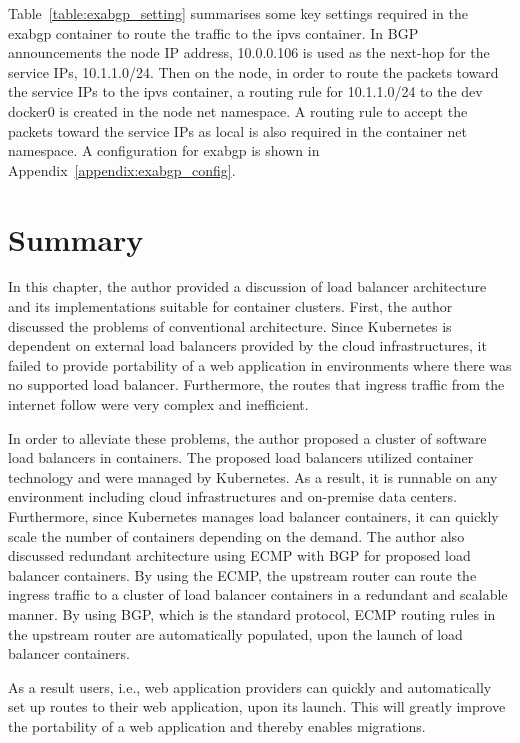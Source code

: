Table~\ref{table:exabgp_setting} summarises some key settings required in the exabgp container to route the traffic to the ipvs container.
In BGP announcements the node IP address, 10.0.0.106 is used as the next-hop for the service IPs, 10.1.1.0/24.
Then on the node, in order to route the packets toward the service IPs to the ipvs container, 
a routing rule for 10.1.1.0/24 to the dev docker0 is created in the node net namespace. 
A routing rule to accept the packets toward the service IPs as local is also required in the container net namespace. 
A configuration for exabgp is shown in Appendix~\ref{appendix:exabgp_config}.

\FloatBarrier



\section{Summary}

In this chapter, the author provided a discussion of load balancer architecture and its implementations suitable for container clusters.
%
First, the author discussed the problems of conventional architecture.
Since Kubernetes is dependent on external load balancers provided by the cloud infrastructures,
it failed to provide portability of a web application in environments where there was no supported load balancer.
Furthermore, the routes that ingress traffic from the internet follow were very complex and inefficient.

In order to alleviate these problems, the author proposed a cluster of software load balancers in containers.
The proposed load balancers utilized container technology and were managed by Kubernetes.
As a result, it is runnable on any environment including cloud infrastructures and on-premise data centers.
Furthermore, since Kubernetes manages load balancer containers, it can quickly scale the number of containers depending on the demand.
%
The author also discussed redundant architecture using ECMP with BGP for proposed load balancer containers.
By using the ECMP, the upstream router can route the ingress traffic to a cluster of load balancer containers in a redundant and scalable manner.
By using BGP, which is the standard protocol, ECMP routing rules in the upstream router are automatically populated, upon the launch of load balancer containers.

As a result users, i.e., web application providers can quickly and automatically set up routes to their web application, upon its launch.
This will greatly improve the portability of a web application and thereby enables migrations.


